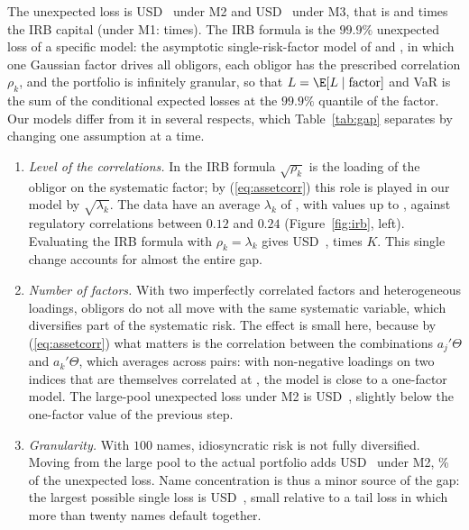 The unexpected loss is USD~ under M2 and USD~ under M3, that is  and  times the IRB capital (under M1:  times). The IRB formula is the $99.9\%$ unexpected loss of a specific model: the asymptotic single-risk-factor model of \citet{Vasicek02} and \citet{Gordy03}, in which one Gaussian factor drives all obligors, each obligor has the prescribed correlation $\rho_k$, and the portfolio is infinitely granular, so that $L=\E[L\mid\text{factor}]$ and VaR is the sum of the conditional expected losses at the $99.9\%$ quantile of the factor. Our models differ from it in several respects, which Table~\ref{tab:gap} separates by changing one assumption at a time.
\begin{enumerate}
\item \emph{Level of the correlations.} In the IRB formula $\sqrt{\rho_k}$ is the loading of the obligor on the systematic factor; by (\ref{eq:assetcorr}) this role is played in our model by $\sqrt{\lambda_k}$. The data have an average $\lambda_k$ of , with values up to , against regulatory correlations between $0.12$ and $0.24$ (Figure~\ref{fig:irb}, left). Evaluating the IRB formula with $\rho_k=\lambda_k$ gives USD~,  times $K$. This single change accounts for almost the entire gap.
\item \emph{Number of factors.} With two imperfectly correlated factors and heterogeneous loadings, obligors do not all move with the same systematic variable, which diversifies part of the systematic risk. The effect is small here, because by (\ref{eq:assetcorr}) what matters is the correlation between the combinations $a_j'\Theta$ and $a_k'\Theta$, which averages  across pairs: with non-negative loadings on two indices that are themselves correlated at , the model is close to a one-factor model. The large-pool unexpected loss under M2 is USD~, slightly below the one-factor value of the previous step.
\item \emph{Granularity.} With $100$ names, idiosyncratic risk is not fully diversified. Moving from the large pool to the actual portfolio adds USD~ under M2, \% of the unexpected loss. Name concentration is thus a minor source of the gap: the largest possible single loss is USD~, small relative to a tail loss in which more than twenty names default together.

\end{enumerate}
